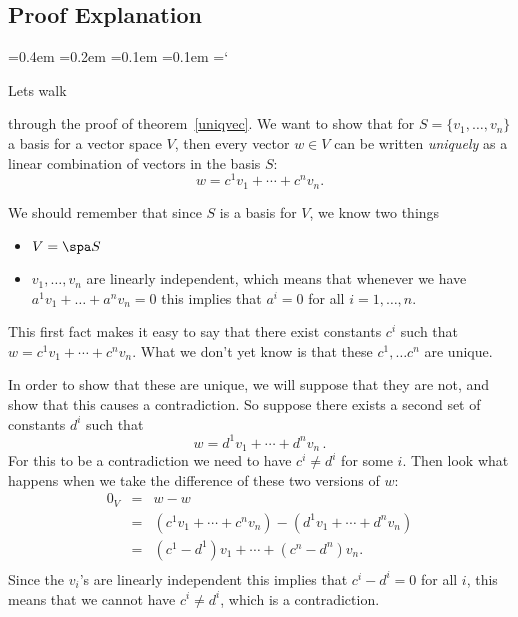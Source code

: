 
\subsection*{Proof Explanation}

{\ttfamily
{}\font=0.4em
\font=0.2em
\font=0.1em
\font=0.1em
\hyphenchar\font=`\-


\hypertarget{basis_and_dimension_thm}{Lets walk } through the proof of theorem~\ref{uniqvec}. We want to show that for $S=\{v_1, \ldots, v_n \}$ a basis for a vector space $V$, then every vector $w \in V$ can be written \emph{uniquely} as a linear combination of vectors in the basis $S$:
\[
w=c^1v_1+\cdots + c^nv_n.
\]

We should remember that since $S$ is a basis for $V$, we know two things
\begin{itemize}
\item $V = \spa S$
\item $ v_1, \ldots , v_n$ are linearly independent, which means that whenever we have 
$
a^1v_1+ \ldots + a^n v_n = 0
$
this implies that $a^i =0$ for all $i=1, \ldots, n$.
\end{itemize}
This first fact makes it easy to say that there exist constants $c^i$ such that $w=c^1v_1+\cdots + c^nv_n$. What we don't yet know is that these $c^1, \ldots c^n$ are unique.

 In order to show that these are unique, we will suppose that they are not, and show that this causes a contradiction. So suppose there exists a second set of constants $d^i$ such that 
$$w=d^1v_1+\cdots + d^nv_n\, .$$ 
For this to be a contradiction we need to have $c^i \neq d^i$ for some $i$. Then look what happens when we take the difference of these two versions of $w$:
\begin{eqnarray*}
0_V&=&w-w\\
&=&(c^1v_1+\cdots + c^nv_n)-(d^1v_1+\cdots + d^nv_n )\\
&=&(c^1-d^1)v_1+\cdots + (c^n-d^n)v_n. \\
\end{eqnarray*}
Since the $v_i$'s are linearly independent this implies that $c^i - d^i = 0$ for all $i$, this means that we cannot have $c^i \neq d^i$, which is a contradiction.



} %

